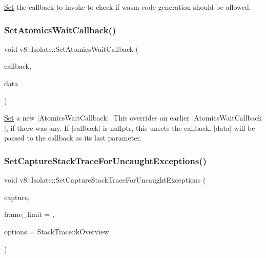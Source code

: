 \mbox{\hyperlink{classv8_1_1Set}{Set}} the callback to invoke to check if wasm code generation should be allowed. \mbox{\label{classv8_1_1Isolate_ae50278f0bb363a1346ab332f2a833921}} 
\subsubsection{\texorpdfstring{Set\+Atomics\+Wait\+Callback()}{SetAtomicsWaitCallback()}}
{\footnotesize\ttfamily void v8\+::\+Isolate\+::\+Set\+Atomics\+Wait\+Callback (\begin{DoxyParamCaption}\item[{\mbox{\hyperlink{classv8_1_1Isolate_a94e0b85c927b71a6501d73c68a454758}{Atomics\+Wait\+Callback}}}]{callback,  }\item[{void $\ast$}]{data }\end{DoxyParamCaption})}

\mbox{\hyperlink{classv8_1_1Set}{Set}} a new $\vert$\+Atomics\+Wait\+Callback$\vert$. This overrides an earlier $\vert$\+Atomics\+Wait\+Callback$\vert$, if there was any. If $\vert$callback$\vert$ is nullptr, this unsets the callback. $\vert$data$\vert$ will be passed to the callback as its last parameter. \mbox{\label{classv8_1_1Isolate_a0ea70b9953abf15184a20eba6aab389f}} 
\subsubsection{\texorpdfstring{Set\+Capture\+Stack\+Trace\+For\+Uncaught\+Exceptions()}{SetCaptureStackTraceForUncaughtExceptions()}}
{\footnotesize\ttfamily void v8\+::\+Isolate\+::\+Set\+Capture\+Stack\+Trace\+For\+Uncaught\+Exceptions (\begin{DoxyParamCaption}\item[{bool}]{capture,  }\item[{int}]{frame\+\_\+limit = {},  }\item[{\mbox{\hyperlink{classv8_1_1StackTrace_a9704e4a37949eb8eb8ccddbddf161492}{Stack\+Trace\+::\+Stack\+Trace\+Options}}}]{options = {\ttfamily StackTrace\+:\+:kOverview} }\end{DoxyParamCaption})}

